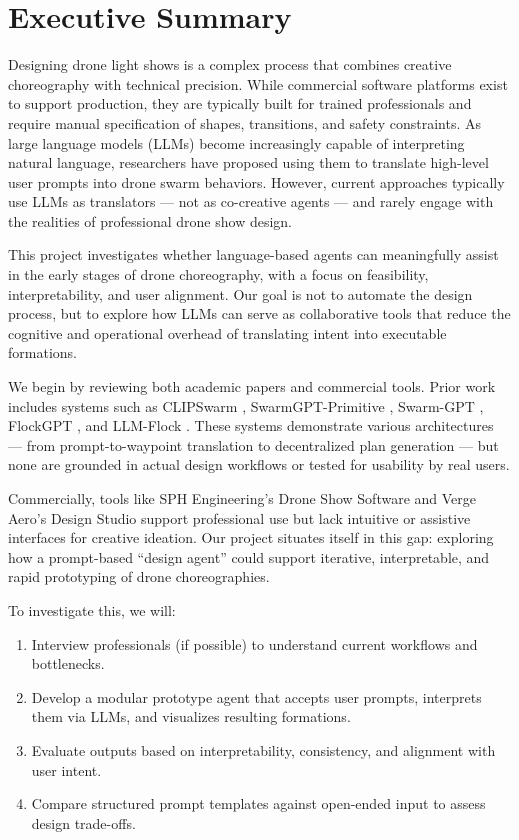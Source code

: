 \newpage
\section{Executive Summary}

Designing drone light shows is a complex process that combines creative choreography with technical precision. While commercial software platforms exist to support production, they are typically built for trained professionals and require manual specification of shapes, transitions, and safety constraints. As large language models (LLMs) become increasingly capable of interpreting natural language, researchers have proposed using them to translate high-level user prompts into drone swarm behaviors. However, current approaches typically use LLMs as translators — not as co-creative agents — and rarely engage with the realities of professional drone show design.

This project investigates whether language-based agents can meaningfully assist in the early stages of drone choreography, with a focus on feasibility, interpretability, and user alignment. Our goal is not to automate the design process, but to explore how LLMs can serve as collaborative tools that reduce the cognitive and operational overhead of translating intent into executable formations.

We begin by reviewing both academic papers and commercial tools. Prior work
includes systems such as 
CLIPSwarm \parencite{pueyo2024clipswarm}, 
SwarmGPT-Primitive \parencite{jiao2023swarmgpt}, 
Swarm-GPT \parencite{vyas2024swarmgptprimitive}, 
FlockGPT \parencite{li2025llmflock}, and 
LLM-Flock \parencite{li2025llmflock}. 
These systems demonstrate various architectures — from prompt-to-waypoint translation to decentralized plan generation — but none are grounded in actual design workflows or tested for usability by real users.

Commercially, tools like SPH Engineering's Drone Show Software and Verge Aero's Design Studio support professional use but lack intuitive or assistive interfaces for creative ideation. Our project situates itself in this gap: exploring how a prompt-based “design agent” could support iterative, interpretable, and rapid prototyping of drone choreographies.

To investigate this, we will:
\begin{enumerate}
    \item Interview professionals (if possible) to understand current workflows and bottlenecks.
    \item Develop a modular prototype agent that accepts user prompts, interprets them via LLMs, and visualizes resulting formations.
    \item Evaluate outputs based on interpretability, consistency, and alignment with user intent.
    \item Compare structured prompt templates against open-ended input to assess design trade-offs.  
\end{enumerate}

